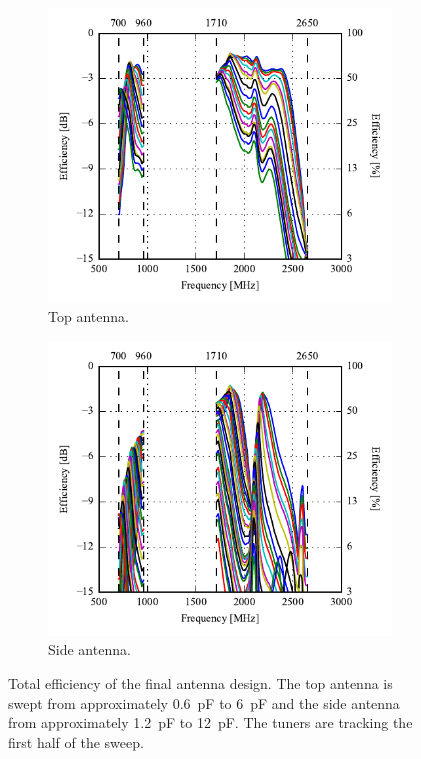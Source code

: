\begin{figure}[htbp]
    \centering
    \begin{subfigure}{0.49\linewidth}
        \includegraphics{img/tech_sol/monopole/highband/meas/final_tuner/efficiency_top.pdf}
        \caption{Top antenna.}
    \end{subfigure}
    \hfill
    \begin{subfigure}{0.49\linewidth}
        \includegraphics{img/tech_sol/monopole/highband/meas/final_tuner/efficiency_side.pdf}
        \caption{Side antenna.}
    \end{subfigure}
    \caption{Total efficiency of the final antenna design. The top antenna is swept from approximately \SI{0.6}{pF} to \SI{6}{pF} and the side antenna from approximately \SI{1.2}{pF} to \SI{12}{pF}. The tuners are tracking the first half of the sweep.}
    \label{fig:final_efficiency}
\end{figure}

